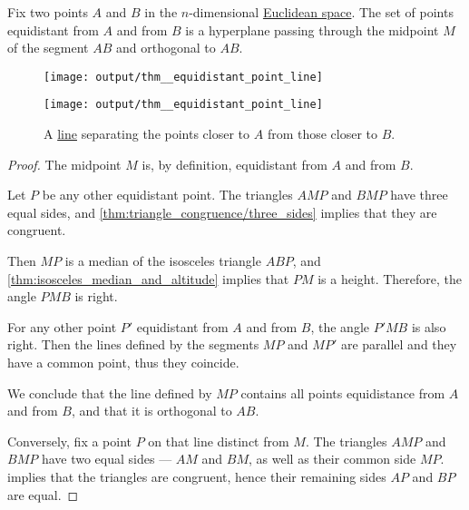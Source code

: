 \begin{proposition}\label{thm:equidistant_point_line}
  Fix two points \( A \) and \( B \) in the \( n \)-dimensional \hyperref[def:euclidean_space]{Euclidean space}. The set of points equidistant from \( A \) and from \( B \) is a hyperplane passing through the midpoint \( M \) of the segment \( AB \) and orthogonal to \( AB \).

  \begin{figure}[!ht]
    \begin{subcaptionblock}[t]{0.45\linewidth}
      \centering
      \texttt{[image: output/thm\_\_equidistant\_point\_line]}
    \end{subcaptionblock}
    \hfill
    \begin{subcaptionblock}[t]{0.45\linewidth}
      \centering
      \texttt{[image: output/thm\_\_equidistant\_point\_line]}
    \end{subcaptionblock}
    \caption{A \hyperref[def:affine_hyperplane]{line} separating the points closer to \( A \) from those closer to \( B \).}\label{fig:thm:equidistant_point_line}
  \end{figure}
\end{proposition}
\begin{proof}
  The midpoint \( M \) is, by definition, equidistant from \( A \) and from \( B \).

  Let \( P \) be any other equidistant point. The triangles \( AMP \) and \( BMP \) have three equal sides, and \cref{thm:triangle_congruence/three_sides} implies that they are congruent.

  Then \( MP \) is a median of the isosceles triangle \( ABP \), and \cref{thm:isosceles_median_and_altitude} implies that \( PM \) is a height. Therefore, the angle \( PMB \) is right.

  For any other point \( P' \) equidistant from \( A \) and from \( B \), the angle \( P'MB \) is also right. Then the lines defined by the segments \( MP \) and \( MP' \) are parallel and they have a common point, thus they coincide.

  We conclude that the line defined by \( MP \) contains all points equidistance from \( A \) and from \( B \), and that it is orthogonal to \( AB \).

  Conversely, fix a point \( P \) on that line distinct from \( M \). The triangles \( AMP \) and \( BMP \) have two equal sides --- \( AM \) and \( BM \), as well as their common side \( MP \).  implies that the triangles are congruent, hence their remaining sides \( AP \) and \( BP \) are equal.
\end{proof}

